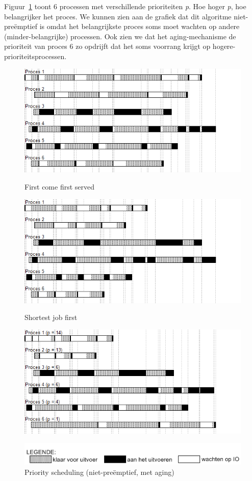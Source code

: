 Figuur~\ref{fig:schedpsnopre} toont 6 processen met verschillende prioriteiten \emph{p}. Hoe hoger \emph{p}, hoe belangrijker het proces. We kunnen zien aan de grafiek dat dit algoritme niet-pre\"emptief is omdat het belangrijkste proces soms moet wachten op andere (minder-belangrijke) processen. Ook zien we dat het aging-mechanisme de prioriteit van proces 6 zo opdrijft dat het soms voorrang krijgt op hogere-prioriteitsprocessen.

\begin{figure}
\begin{center}
\centering
  \includegraphics[width=\linewidth]{images/schedule_fcfs.png}
  \caption{First come first served}
  \label{fig:schedfcfs}
  \centering
  \includegraphics[width=\linewidth]{images/schedule_sjf.png}
  \caption{Shortest job first}
  \label{fig:schedsjf}
  \centering
  \includegraphics[width=\linewidth]{images/schedule_ps_noqua_age.png}
  \caption{Priority scheduling (niet-pre\"emptief, met aging)}
  \label{fig:schedpsnopre}
  \includegraphics[width=0.8\linewidth]{images/legende.png}
\end{center}
\end{figure}

